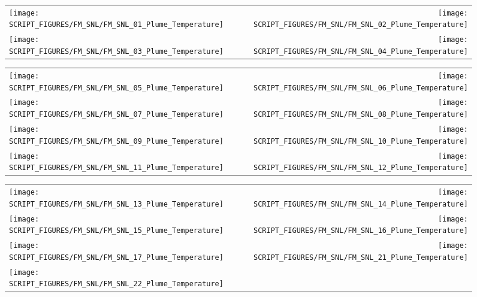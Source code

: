 \begin{figure}[h!]
\begin{tabular*}{\textwidth}{l@{\extracolsep{\fill}}r}
\texttt{[image: SCRIPT\_FIGURES/FM\_SNL/FM\_SNL\_01\_Plume\_Temperature]} &
\texttt{[image: SCRIPT\_FIGURES/FM\_SNL/FM\_SNL\_02\_Plume\_Temperature]} \\
\texttt{[image: SCRIPT\_FIGURES/FM\_SNL/FM\_SNL\_03\_Plume\_Temperature]} &
\texttt{[image: SCRIPT\_FIGURES/FM\_SNL/FM\_SNL\_04\_Plume\_Temperature]}
\end{tabular*}
\label{FM_SNL_Plume_1}
\end{figure}

\newpage

\begin{figure}[p]
\begin{tabular*}{\textwidth}{l@{\extracolsep{\fill}}r}
\texttt{[image: SCRIPT\_FIGURES/FM\_SNL/FM\_SNL\_05\_Plume\_Temperature]} &
\texttt{[image: SCRIPT\_FIGURES/FM\_SNL/FM\_SNL\_06\_Plume\_Temperature]} \\
\texttt{[image: SCRIPT\_FIGURES/FM\_SNL/FM\_SNL\_07\_Plume\_Temperature]} &
\texttt{[image: SCRIPT\_FIGURES/FM\_SNL/FM\_SNL\_08\_Plume\_Temperature]} \\
\texttt{[image: SCRIPT\_FIGURES/FM\_SNL/FM\_SNL\_09\_Plume\_Temperature]} &
\texttt{[image: SCRIPT\_FIGURES/FM\_SNL/FM\_SNL\_10\_Plume\_Temperature]} \\
\texttt{[image: SCRIPT\_FIGURES/FM\_SNL/FM\_SNL\_11\_Plume\_Temperature]} &
\texttt{[image: SCRIPT\_FIGURES/FM\_SNL/FM\_SNL\_12\_Plume\_Temperature]}
\end{tabular*}
\label{FM_SNL_Plume_2}
\end{figure}

\begin{figure}[p]
\begin{tabular*}{\textwidth}{l@{\extracolsep{\fill}}r}
\texttt{[image: SCRIPT\_FIGURES/FM\_SNL/FM\_SNL\_13\_Plume\_Temperature]} &
\texttt{[image: SCRIPT\_FIGURES/FM\_SNL/FM\_SNL\_14\_Plume\_Temperature]} \\
\texttt{[image: SCRIPT\_FIGURES/FM\_SNL/FM\_SNL\_15\_Plume\_Temperature]} &
\texttt{[image: SCRIPT\_FIGURES/FM\_SNL/FM\_SNL\_16\_Plume\_Temperature]} \\
\texttt{[image: SCRIPT\_FIGURES/FM\_SNL/FM\_SNL\_17\_Plume\_Temperature]} &
\texttt{[image: SCRIPT\_FIGURES/FM\_SNL/FM\_SNL\_21\_Plume\_Temperature]} \\
\texttt{[image: SCRIPT\_FIGURES/FM\_SNL/FM\_SNL\_22\_Plume\_Temperature]} &

\end{tabular*}
\label{FM_SNL_Plume_3}
\end{figure}

